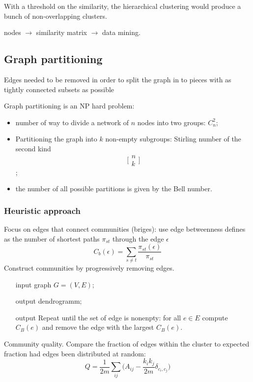 \documentclass[a4paper]{article}
\begin{document}
With a threshold on the similarity, the hierarchical clustering would produce a bunch of non-overlapping clusters.

nodes $\to$ similarity matrix $\to$ data mining.

\subsection{Graph partitioning} %
\label{sub:graph_partitioning}

Edges needed to be removed in order to split the graph in to pieces with as tightly connected subsets as possible


Graph partitioning is an NP hard problem: \begin{itemize}
	\item number of way to divide a network of $n$ nodes into two groups: $C^2_n$;
	\item Partitioning the graph into $k$ non-empty subgroups: Stirling number of the second kind \[\big[\begin{matrix}n\\k\end{matrix}\big]\];
	\item the number of all possible partitions is given by the Bell number.
\end{itemize}

\subsubsection{Heuristic approach} %
\label{ssub:heuristic_approach}

Focus on edges that connect communities (briges): use edge betweenness defines as the number of shortest paths $\pi_{st}$ through the edge $\epsilon$
\[C_b(\epsilon) = \sum_{s\neq t} \frac{\pi_{st}(\epsilon)}{\pi_{st}}\]
Construct communities by progressively removing edges.

\begin{itemize}
	\item[input] graph $G=(V,E)$;
	\item[output] dendrogramm;
	\item[output] Repeat until the set of edge is nonenpty:
	for all $e\in E$ compute $C_B(e)$ and remove the edge with the largest $C_B(e)$.
\end{itemize}

Community quality. Compare the fraction of edges within the cluster to expected fraction had edges been distributed at random:
\[Q = \frac{1}{2m}\sum_{ij} \big(A_{ij} - \frac{k_ik_j}{2m} \delta_{c_i,c_j}\big)\]
\end{document}

